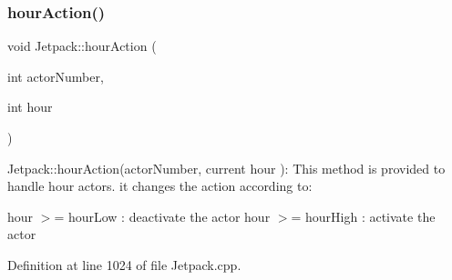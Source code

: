 \subsubsection{\texorpdfstring{hour\+Action()}{hourAction()}}
{\footnotesize\ttfamily void Jetpack\+::hour\+Action (\begin{DoxyParamCaption}\item[{int}]{actor\+Number,  }\item[{int}]{hour }\end{DoxyParamCaption})}

Jetpack\+::hour\+Action(actor\+Number, current hour )\+: This method is provided to handle hour actors. it changes the action according to\+:

hour $>$= hour\+Low \+: deactivate the actor hour $>$= hour\+High \+: activate the actor 

Definition at line 1024 of file Jetpack.\+cpp.


